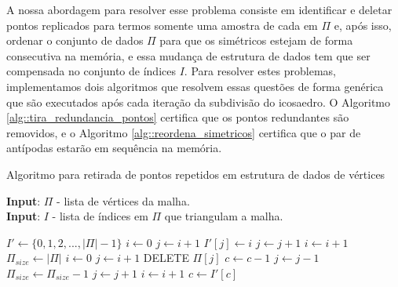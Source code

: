 A nossa abordagem para resolver esse problema consiste em identificar e deletar pontos replicados para termos somente uma amostra de cada em $\Pi$ e, após isso, ordenar o conjunto de dados $\Pi$ para que os simétricos estejam de forma consecutiva na memória, e essa mudança de estrutura de dados tem que ser compensada no conjunto de índices $I$. Para resolver estes problemas, implementamos dois algoritmos que resolvem essas questões de forma genérica que são executados após cada iteração da subdivisão do icosaedro. O Algoritmo \ref{alg::tira_redundancia_pontos} certifica que os pontos redundantes são removidos, e o Algoritmo \ref{alg::reordena_simetricos} certifica que o par de antípodas estarão em sequência na memória.

\begin{algorithm}
\caption{Algoritmo para retirada de pontos repetidos em estrutura de dados de vértices}
\label{alg::tira_redundancia_pontos}
\hspace*{\algorithmicindent} \textbf{Input}: $\Pi$ - lista de vértices da malha.\\
\hspace*{\algorithmicindent} \textbf{Input}: $I$ - lista de índices em $\Pi$ que triangulam a malha.
\begin{algorithmic}[1]
 \State $I' \gets \{0, 1, 2, ..., |\Pi| - 1\}$
\State $i \gets 0$
 \label{alg::svs_pt1_inicio}
    \State $j \gets i + 1$
        \If {$\Pi[i] = \Pi[j]$}
            \State $I'[j] \gets i$
        \EndIf
        \State $j \gets j + 1$
    \EndWhile
    \State $i \gets i + 1$
\EndWhile \label{alg::svs_pt1_fim}
\State $\Pi_{size} \gets |\Pi|$
\State $i \gets 0$
 \label{alg::svs_pt2_inicio}
    \State $j \gets i + 1$
        \If{$\Pi[i] = \Pi[j]$}
            \State DELETE $\Pi[j]$ \label{alg::delete}
                \State $c \gets c - 1$
            \EndFor
            \State $j \gets j - 1$
            \State $\Pi_{size} \gets \Pi_{size} - 1$
        \EndIf
        \State $j \gets j + 1$
    \EndWhile
    \State $i \gets i + 1$
\EndWhile \label{alg::svs_pt2_fim}
 \label{alg::resetI}
    \State $c \gets I'[c]$
\EndFor
\EndProcedure
\end{algorithmic}
\end{algorithm}

